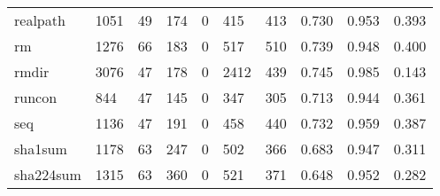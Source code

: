 \begin{longtable}{lp{1.3cm}p{1.3cm}p{1.3cm}p{1.3cm}p{1.3cm}p{1.3cm}p{1.3cm}p{1.3cm}p{1.3cm}}
realpath  &                   1051 &                                 49 &                               174 &                                0 &                               415 &                             413 &                                   0.730 &                                  0.953 &                                0.393 \\
rm        &                   1276 &                                 66 &                               183 &                                0 &                               517 &                             510 &                                   0.739 &                                  0.948 &                                0.400 \\
rmdir     &                   3076 &                                 47 &                               178 &                                0 &                              2412 &                             439 &                                   0.745 &                                  0.985 &                                0.143 \\
runcon    &                    844 &                                 47 &                               145 &                                0 &                               347 &                             305 &                                   0.713 &                                  0.944 &                                0.361 \\
seq       &                   1136 &                                 47 &                               191 &                                0 &                               458 &                             440 &                                   0.732 &                                  0.959 &                                0.387 \\
sha1sum   &                   1178 &                                 63 &                               247 &                                0 &                               502 &                             366 &                                   0.683 &                                  0.947 &                                0.311 \\
sha224sum &                   1315 &                                 63 &                               360 &                                0 &                               521 &                             371 &                                   0.648 &                                  0.952 &                                0.282 \\

\end{longtable}
